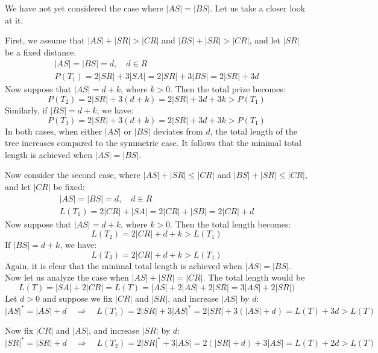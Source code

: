 \documentclass[12pt]{book}
\newcommand{\Ptotal}[1]{P(#1)}
\begin{document}
	
		 
	
	
	We have not yet considered the case where \( |AS| = |BS| \). Let us take a closer look at it. 
	
	First, we assume that \( |AS| + |SR| > |CR| \) and \( |BS| + |SR| > |CR| \), and let \( |SR| \) be a fixed distance.
	\begin{align*}
		|AS| = |BS| = d, \quad d \in R \\
		\Ptotal{T_1} = 2|SR| + 3|SA| = 2|SR| + 3|BS| = 2|SR| + 3d
	\end{align*}
	Now suppose that \( |AS| = d + k \), where \( k > 0 \). Then the total prize becomes:
	\[
	\Ptotal{T_2} = 2|SR| + 3(d + k) = 2|SR| + 3d + 3k > \Ptotal{T_1}
	\]
	Similarly, if \( |BS| = d + k \), we have:
	\[
	\Ptotal{T_3} = 2|SR| + 3(d + k) = 2|SR| + 3d + 3k > \Ptotal{T_1}
	\]
	In both cases, when either \( |AS| \) or \( |BS| \) deviates from \( d \), the total length of the tree increases compared to the symmetric case. It follows that the minimal total length is achieved when \( |AS| = |BS| \).
	
	Now consider the second case, where \( |AS| + |SR| \leq |CR| \) and \( |BS| + |SR| \leq |CR| \), and let \( |CR| \) be fixed:
	\begin{align*}
		|AS| = |BS| = d, \quad d \in R \\
		L(T_1) = 2|CR| + |SA| = 2|CR| + |SB| = 2|CR| + d
	\end{align*}
	Now suppose that \( |AS| = d + k \), where \( k > 0 \). Then the total length becomes:
	\[
	L(T_2) = 2|CR| + d + k > L(T_1)
	\]
	If \( |BS| = d + k \), we have:
	\[
	L(T_3) = 2|CR| + d + k > L(T_1)
	\]
	Again, it is clear that the minimal total length is achieved when \( |AS| = |BS| \).\\

	Now let us analyze the case when \(|AS|+|SR| = |CR| \).
	The total length would be \[ L(T) = |SA| + 2 |CR| = L(T) = |AS| + 2|AS| + 2|SR| = 3|AS| + 2|SR|  )\]
	Let \( d > 0 \) and suppose we fix \( |CR| \) and \( |SR| \), and increase \( |AS| \) by \( d \):
	\[
	|AS|^* = |AS| + d \quad \Rightarrow \quad L(T_1) = 2|SR| + 3|AS|^* = 2|SR| + 3(|AS| + d) = L(T) + 3d > L(T)
	\]
	
	Now fix \( |CR| \) and \( |AS| \), and increase \( |SR| \) by \( d \):
	\[
	|SR|^* = |SR| + d \quad \Rightarrow \quad L(T_2) = 2|SR|^* + 3|AS| = 2(|SR| + d) + 3|AS| = L(T) + 2d > L(T)
	\]
	
\end{document}
